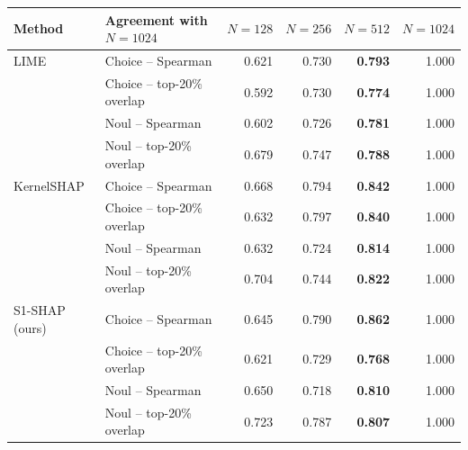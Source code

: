 \begin{tabular}{llrrrr}
\toprule
Method & Agreement with $N=1024$ & $N=128$ & $N=256$ & $N=512$ & $N=1024$ \\
\midrule
LIME & Choice -- Spearman & 0.621 & 0.730 & \textbf{0.793} & 1.000 \\
 & Choice -- top-20\% overlap & 0.592 & 0.730 & \textbf{0.774} & 1.000 \\
 & Noul -- Spearman & 0.602 & 0.726 & \textbf{0.781} & 1.000 \\
 & Noul -- top-20\% overlap & 0.679 & 0.747 & \textbf{0.788} & 1.000 \\
\midrule
KernelSHAP & Choice -- Spearman & 0.668 & 0.794 & \textbf{0.842} & 1.000 \\
 & Choice -- top-20\% overlap & 0.632 & 0.797 & \textbf{0.840} & 1.000 \\
 & Noul -- Spearman & 0.632 & 0.724 & \textbf{0.814} & 1.000 \\
 & Noul -- top-20\% overlap & 0.704 & 0.744 & \textbf{0.822} & 1.000 \\
\midrule
S1-SHAP (ours) & Choice -- Spearman & 0.645 & 0.790 & \textbf{0.862} & 1.000 \\
 & Choice -- top-20\% overlap & 0.621 & 0.729 & \textbf{0.768} & 1.000 \\
 & Noul -- Spearman & 0.650 & 0.718 & \textbf{0.810} & 1.000 \\
 & Noul -- top-20\% overlap & 0.723 & 0.787 & \textbf{0.807} & 1.000 \\
\bottomrule
\end{tabular}
